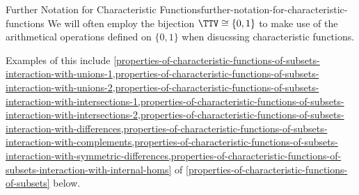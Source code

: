 \begin{notation}{Further Notation for Characteristic Functions}{further-notation-for-characteristic-functions}%
    We will often employ the bijection $\TTV\cong\{0,1\}$ to make use of the arithmetical operations defined on $\{0,1\}$ when disucssing characteristic functions.

    \indent Examples of this include \cref{properties-of-characteristic-functions-of-subsets-interaction-with-unions-1,properties-of-characteristic-functions-of-subsets-interaction-with-unions-2,properties-of-characteristic-functions-of-subsets-interaction-with-intersections-1,properties-of-characteristic-functions-of-subsets-interaction-with-intersections-2,properties-of-characteristic-functions-of-subsets-interaction-with-differences,properties-of-characteristic-functions-of-subsets-interaction-with-complements,properties-of-characteristic-functions-of-subsets-interaction-with-symmetric-differences,properties-of-characteristic-functions-of-subsets-interaction-with-internal-homs} of \cref{properties-of-characteristic-functions-of-subsets} below.
\end{notation}
